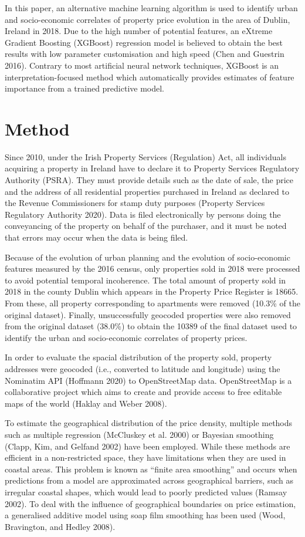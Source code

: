 \documentclass[conference,final,]{IEEEtran}
\begin{document}
In this paper, an alternative machine learning algorithm is used to identify urban and socio-economic correlates of property price evolution in the area of Dublin, Ireland in 2018. Due to the high number of potential features, an eXtreme Gradient Boosting (XGBoost) regression model is believed to obtain the best results with low parameter customisation and high speed (Chen and Guestrin 2016). Contrary to most artificial neural network techniques, XGBoost is an interpretation-focused method which automatically provides estimates of feature importance from a trained predictive model.

\hypertarget{method}{%
\section{Method}\label{method}}

Since 2010, under the Irish Property Services (Regulation) Act, all individuals acquiring a property in Ireland have to declare it to Property Services Regulatory Authority (PSRA). They must provide details such as the date of sale, the price and the address of all residential properties purchased in Ireland as declared to the Revenue Commissioners for stamp duty purposes (Property Services Regulatory Authority 2020). Data is filed electronically by persons doing the conveyancing of the property on behalf of the purchaser, and it must be noted that errors may occur when the data is being filed.

Because of the evolution of urban planning and the evolution of socio-economic features measured by the 2016 census, only properties sold in 2018 were processed to avoid potential temporal incoherence. The total amount of property sold in 2018 in the county Dublin which appears in the Property Price Register is 18665. From these, all property corresponding to apartments were removed (10.3\% of the original dataset). Finally, unsuccessfully geocoded properties were also removed from the original dataset (38.0\%) to obtain the 10389 of the final dataset used to identify the urban and socio-economic correlates of property prices.

In order to evaluate the spacial distribution of the property sold, property addresses were geocoded (i.e., converted to latitude and longitude) using the Nominatim API (Hoffmann 2020) to OpenStreetMap data. OpenStreetMap is a collaborative project which aims to create and provide access to free editable maps of the world (Haklay and Weber 2008).

To estimate the geographical distribution of the price density, multiple methods such as multiple regression (McCluskey et al. 2000) or Bayesian smoothing (Clapp, Kim, and Gelfand 2002) have been employed. While these methods are efficient in a non-restricted space, they have limitations when they are used in coastal areas. This problem is known as ``finite area smoothing'' and occurs when predictions from a model are approximated across geographical barriers, such as irregular coastal shapes, which would lead to poorly predicted values (Ramsay 2002). To deal with the influence of geographical boundaries on price estimation, a generalised additive model using soap film smoothing has been used (Wood, Bravington, and Hedley 2008).
\end{document}
